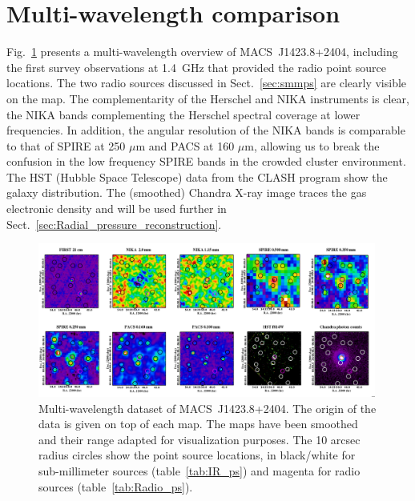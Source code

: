 \documentclass[twocolumn,traditabstract]{aa}
\begin{document}
\section{Multi-wavelength comparison}\label{sec:Multi_wavelength_comparison}
Fig.~\ref{fig:MACSJ1424_mutiw2} presents a multi-wavelength overview of \mbox{MACS~J1423.8+2404}, including the {\sc first} survey \citep[Faint Images of the Radio Sky at Twenty-Centimeters,][]{becker1995} observations at 1.4~GHz that provided the radio point source locations. The two radio sources discussed in Sect.~\ref{sec:smmps} are clearly visible on the map. The complementarity of the Herschel and NIKA instruments is clear, the NIKA bands complementing the Herschel spectral coverage at lower frequencies. In addition, the angular resolution of the NIKA bands is comparable to that of SPIRE at 250 $\mu$m and PACS at 160 $\mu$m, allowing us to break the confusion in the low frequency SPIRE bands in the crowded cluster environment. The HST (Hubble Space Telescope) data from the CLASH program \citep[][Cluster Lensing And Supernova survey with Hubble]{postman2012} show the galaxy distribution. The (smoothed) Chandra X-ray image traces the gas electronic density and will be used further in Sect.~\ref{sec:Radial_pressure_reconstruction}.

\begin{figure}[h]
\centering
\includegraphics[trim=0cm 0cm 0cm 0cm, clip=true, width=0.99\textwidth]{Figure/MACSJ1424_multicolor.png}
\caption{\footnotesize Multi-wavelength dataset of \mbox{MACS~J1423.8+2404}. The origin of the data is given on top of each map. The maps have been smoothed and their range adapted for visualization purposes. The 10 arcsec radius circles show the point source locations, in black/white for sub-millimeter sources (table~\ref{tab:IR_ps}) and magenta for radio sources (table~\ref{tab:Radio_ps}).}
\label{fig:MACSJ1424_mutiw2}
\end{figure}
\end{document}
